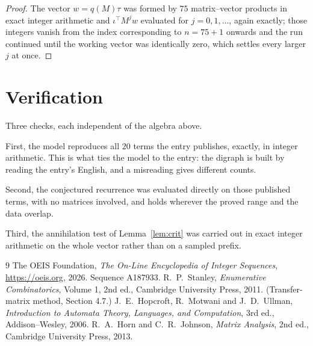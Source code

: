 \documentclass[11pt,a4paper]{article}
\theoremstyle{plain}
\theoremstyle{definition}
\begin{document}
\begin{proof}
The vector $w=q(M)\tau$ was formed by $75$ matrix--vector products in exact integer
arithmetic and $\iota^{\!\top}M^{j}w$ evaluated for $j=0,1,\dots$, again exactly; those
integers vanish from the index corresponding to $n=75+1$ onwards and the run continued
until the working vector was identically zero, which settles every larger $j$ at once.
\end{proof}

\section{Verification}

Three checks, each independent of the algebra above.

First, the model reproduces all $20$ terms the entry publishes, exactly, in integer
arithmetic. This is what ties the model to the entry: the digraph is built by reading the
entry's English, and a misreading gives different counts.

Second, the conjectured recurrence was evaluated directly on those published terms, with no
matrices involved, and holds wherever the proved range and the data overlap.

Third, the annihilation test of Lemma~\ref{lem:crit} was carried out in exact integer
arithmetic on the whole vector rather than on a sampled prefix.

\begin{thebibliography}{9}
 The OEIS Foundation, \emph{The On-Line Encyclopedia of Integer
Sequences}, \url{https://oeis.org}, 2026. Sequence A187933.
 R.~P.~Stanley, \emph{Enumerative Combinatorics}, Volume 1, 2nd ed.,
Cambridge University Press, 2011. (Transfer-matrix method, Section 4.7.)
 J.~E.~Hopcroft, R.~Motwani and J.~D.~Ullman, \emph{Introduction to Automata
Theory, Languages, and Computation}, 3rd ed., Addison--Wesley, 2006.
 R.~A.~Horn and C.~R.~Johnson, \emph{Matrix Analysis}, 2nd ed., Cambridge
University Press, 2013.
\end{thebibliography}
\end{document}
